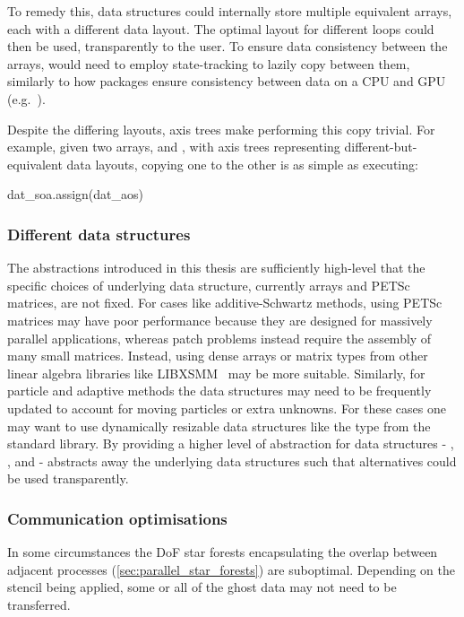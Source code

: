 \documentclass[thesis]{subfiles}
\begin{document}
To remedy this,  data structures could internally store multiple equivalent arrays, each with a different data layout.
The optimal layout for different loops could then be used, transparently to the user.
To ensure data consistency between the arrays,  would need to employ state-tracking to lazily copy between them, similarly to how packages ensure consistency between data on a CPU and GPU (e.g.~\cite{MILLS2021102831}).

Despite the differing layouts, axis trees make performing this copy trivial.
For example, given two arrays,  and , with axis trees representing different-but-equivalent data layouts, copying one to the other is as simple as executing:
\begin{pyinline}
  dat_soa.assign(dat_aos)
\end{pyinline}

\subsubsection{Different data structures}

The abstractions introduced in this thesis are sufficiently high-level that the specific choices of underlying data structure, currently \numpy{} arrays and PETSc matrices, are not fixed.
For cases like additive-Schwartz methods, using PETSc matrices may have poor performance because they are designed for massively parallel applications, whereas patch problems instead require the assembly of many small matrices.
Instead, using dense arrays or matrix types from other linear algebra libraries like LIBXSMM~\cite{heineckeLIBXSMMAcceleratingSmall2016} may be more suitable.
Similarly, for particle and adaptive methods the data structures may need to be frequently updated to account for moving particles or extra unknowns.
For these cases one may want to use dynamically resizable data structures like the  type from the \cplusplus{} standard library.
By providing a higher level of abstraction for data structures - , , and  -  abstracts away the underlying data structures such that alternatives could be used transparently.

\subsubsection{Communication optimisations}

In some circumstances the DoF star forests encapsulating the overlap between adjacent processes (\cref{sec:parallel_star_forests}) are suboptimal.
Depending on the stencil being applied, some or all of the ghost data may not need to be transferred.
\end{document}
